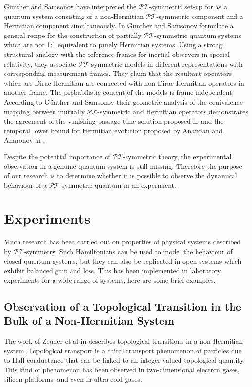 \documentclass[12pt, a4paper]{report}
\newcommand\PT{\(\mathcal{PT}\)}
\begin{document}
G\"{u}nther and Samsonov have interpreted the \PT-symmetric set-up for \cite{Bender_2007} as a quantum system
consisting of a non-Hermitian \PT-symmetric component and a Hermitian component simultaneously. In \cite{Gunther_2008} G\"{u}nther and Samsonov formulate a general recipe for the construction of partially \PT-symmetric quantum
systems which are not 1:1 equivalent to purely Hermitian systems. Using a strong structural analogy with the
reference frames for inertial observers in special relativity, they associate \PT-symmetric models in different
representations with corresponding measurement frames. They claim that the resultant operators which are Dirac Hermitian
are connected with non-Dirac-Hermitian operators in another frame. The probabilistic content of the models
is frame-independent. According to G\"{u}nther and Samsonov their geometric analysis of the equivalence mapping between mutually \PT-symmetric and Hermitian operators demonstrates the agreement of the vanishing passage-time solution proposed in \cite{Bender_2007} and the temporal lower bound for Hermitian evolution proposed by Anandan and Aharonov in \cite{AnandanAharonov}. 

Despite the potential importance of \PT-symmetric theory, the experimental observation in a genuine quantum system is still missing\cite{Cartarius}. Therefore the purpose of our research is to determine whether it is possible to observe the dynamical behaviour of a \PT-symmetric quantum in an experiment. 

\chapter{Experiments}\label{Experiments}
Much research has been carried out on properties of physical systems described by \PT-symmetry. Such Hamiltonians can be used to model the behaviour of closed quantum systems, but they can also be replicated in open systems which exhibit balanced gain and loss. This has been implemented in laboratory experiments for a wide range of systems\cite{geometric_aspects}, here are some brief examples.

\section{Observation of a Topological Transition in the Bulk of a Non-Hermitian System}\label{TopologicalTrans}
The work of Zeuner et al in \cite{TopoTrans} describes topological transitions in a non-Hermitian system. 
Topological transport is a chiral transport phenomenon of particles due to Hall conductance that can be linked to an integer-valued topological quantity. This kind of phenomenon has been observed in two-dimensional electron gases, silicon platforms, and even in ultra-cold gases\cite{TopoTrans}. 
\end{document}
